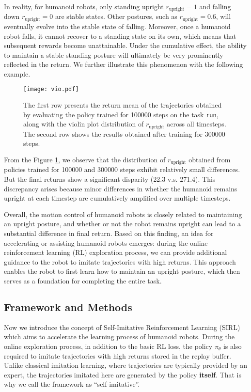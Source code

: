 In reality, for humanoid robots, only standing upright $r_{\text{upright}}=1$ and falling down $r_{\text{upright}}=0$ are stable states. 
Other postures, such as $r_{\text{upright}}=0.6$, will eventually evolve into the stable state of falling. 
Moreover, once a humanoid robot falls, it cannot recover to a standing state on its own, which means that subsequent rewards become unattainable. 
Under the cumulative effect, the ability to maintain a stable standing posture will ultimately be very prominently reflected in the return. We further illustrate this phenomenon with the following example.
\begin{figure}[h]
    \centering
    \texttt{[image: vio.pdf]}
    \caption{The first row presents the return mean of the trajectories obtained by evaluating the policy trained for 100000 steps on the task \texttt{run}, along with the violin plot distribution of $r_{\text{upright}}$ across all timesteps. The second row shows the results obtained after training for 300000 steps.}
    \label{fig:vio}
\end{figure}

From the Figure \ref{fig:vio}, we observe that the distribution of $r_{\text{upright}}$ obtained from policies trained for 100000 and 300000 steps exhibit relatively small differences. 
But the final returns show a significant disparity (22.3 v.s. 271.4). 
This discrepancy arises because minor differences in whether the humanoid remains upright at each timestep are cumulatively amplified over multiple timesteps.

Overall, the motion control of humanoid robots is closely related to maintaining an upright posture, and whether or not the robot remains upright can lead to a substantial difference in final return.
Based on this finding, an idea for accelerating or assisting humanoid robots emerges: during the online reinforcement learning (RL) exploration process, we can provide additional guidance to the robot to imitate trajectories with high returns. 
This approach enables the robot to first learn how to maintain an upright posture, which then serves as a foundation for completing the entire task.

\subsection{Framework and Methods}
\label{impl_details}
Now we introduce the concept of Self-Imitative Reinforcement Learning (SIRL) which aims to accelerate the learning process of humanoid robots.
During the online exploration process, in addition to the basic RL loss, the policy $\pi_{\theta}$ is also required to imitate trajectories with high returns stored in the replay buffer. 
Unlike classical imitation learning, where trajectories are typically provided by an expert, the trajectories imitated here are generated by the policy \textbf{itself}. 
That is why we call the framework as ``self-imitative''.

